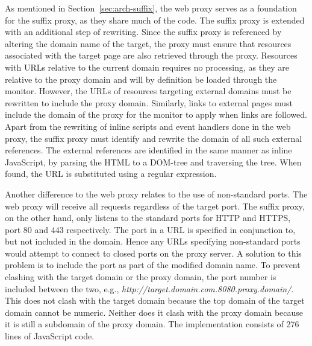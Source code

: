 \documentclass{llncs}
\begin{document}
As mentioned in Section~\ref{sec:arch-suffix}, the web proxy serves as a 
foundation for the suffix proxy, as they share much of the code. The suffix proxy is extended with an additional step of rewriting. 
Since the suffix proxy is referenced by altering the domain name of the target, 
the proxy must ensure that resources associated with the target page are also 
retrieved through the proxy. Resources with URLs relative to the current domain 
requires no processing, as they are relative to the proxy domain and will by 
definition be loaded through the monitor. 
However, the URLs of resources targeting external domains must be rewritten to 
include the proxy domain. Similarly, links to external pages must include the domain of the proxy
for the %
monitor%
to apply 
when links are followed.
Apart from the rewriting of inline 
scripts and event handlers done in the web proxy, the suffix proxy must 
identify and rewrite the domain of all such external references. 
The external references are identified in the same manner as inline JavaScript, 
by parsing the HTML to a DOM-tree and traversing the tree. When found, the 
URL is substituted using a regular expression.%

Another difference to the web proxy relates to the use of non-standard ports.
The web proxy will receive all requests regardless of the target port. The 
suffix proxy, on the other hand, only listens to the standard ports for HTTP and HTTPS, port 80 and 
443 respectively. The port in a URL is specified in conjunction to, but not included in the domain.
Hence any URLs specifying non-standard ports would attempt to connect to closed 
ports on the proxy server. A solution to this problem is to include the port as part 
of the modified domain name. To prevent clashing with the target domain or the proxy domain, 
the port number is included between the two, e.g., \emph{http://target.domain.com.8080.proxy.domain/}.
This does not clash with the target domain because the top domain of the target domain cannot be numeric.
Neither does it clash with the proxy domain because it is still a subdomain of the proxy domain.
%
The implementation consists of 276 lines of JavaScript code.
\end{document}
